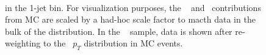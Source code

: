 \begin{figure}[!hbtp]
\begin{center}
\\
\caption{\met in the 1-jet bin. 
For visualization purposes, the \gjets~ and \dyll~contributions from MC are scaled by a had-hoc scale factor to macth data in the bulk of the distribution.
In the \gjets~ sample, data is shown after re-weighting to the \dyll~$p_T$ distribution in MC events.}
\label{fig:met_1j}
\end{center}
\end{figure}

